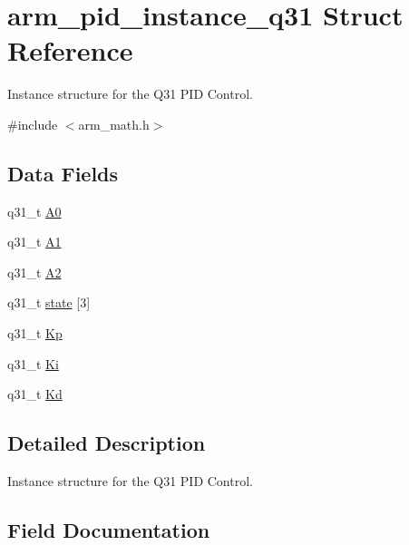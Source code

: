 \hypertarget{structarm__pid__instance__q31}{}\section{arm\+\_\+pid\+\_\+instance\+\_\+q31 Struct Reference}
\label{structarm__pid__instance__q31}


Instance structure for the Q31 P\+ID Control.  




{\ttfamily \#include $<$arm\+\_\+math.\+h$>$}

\subsection*{Data Fields}
\begin{DoxyCompactItemize}
\item 
q31\+\_\+t \hyperlink{structarm__pid__instance__q31_ab58496a4137da4c667915a5fc0ef57ef}{A0}
\item 
q31\+\_\+t \hyperlink{structarm__pid__instance__q31_aeb897c84724b56948e4222aca8d0e1f4}{A1}
\item 
q31\+\_\+t \hyperlink{structarm__pid__instance__q31_a4ae945f839719fb2c04c978724b78ebb}{A2}
\item 
q31\+\_\+t \hyperlink{structarm__pid__instance__q31_af0a2da4da9a94af652873ec7e7be4880}{state} \mbox{[}3\mbox{]}
\item 
q31\+\_\+t \hyperlink{structarm__pid__instance__q31_a6ec4b37fe2246a7e017dd07578fe5bbd}{Kp}
\item 
q31\+\_\+t \hyperlink{structarm__pid__instance__q31_a84a6c05c16369c905193da0d5fc9a7b0}{Ki}
\item 
q31\+\_\+t \hyperlink{structarm__pid__instance__q31_a213bbf14da7ea536998f611977173552}{Kd}
\end{DoxyCompactItemize}


\subsection{Detailed Description}
Instance structure for the Q31 P\+ID Control. 

\subsection{Field Documentation}
\mbox{\label{structarm__pid__instance__q31_ab58496a4137da4c667915a5fc0ef57ef}} 
